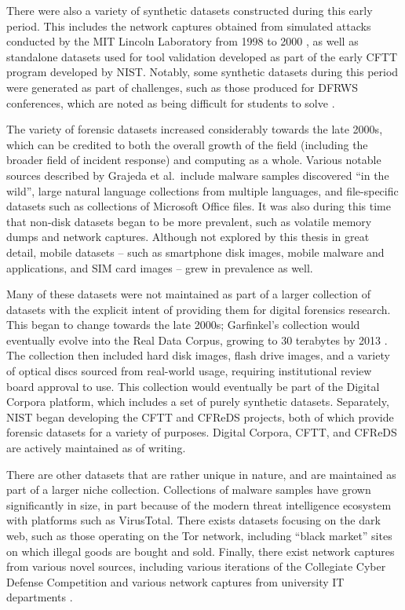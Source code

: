 \documentclass[letterpaper,12pt]{report}
\begin{document}
There were also a variety of synthetic datasets constructed during this
early period. This includes the network captures obtained from simulated
attacks conducted by the MIT Lincoln Laboratory from 1998 to 2000
\cite{garfinkelForensicCorporaChallenge2007}, as well as standalone
datasets used for tool validation developed as part of the early CFTT
program developed by NIST. Notably, some synthetic datasets during this
period were generated as part of challenges, such as those produced for
DFRWS conferences, which are noted as being difficult for students to
solve \cite{woodsCreatingRealisticCorpora2011}.

The variety of forensic datasets increased considerably towards the late
2000s, which can be credited to both the overall growth of the field
(including the broader field of incident response) and computing as a
whole. Various notable sources described by Grajeda et al.~include
malware samples discovered ``in the wild'', large natural language
collections from multiple languages, and file-specific datasets such as
collections of Microsoft Office files. It was also during this time that
non-disk datasets began to be more prevalent, such as volatile memory
dumps and network captures. Although not explored by this thesis in
great detail, mobile datasets -- such as smartphone disk images, mobile
malware and applications, and SIM card images -- grew in prevalence as
well.

Many of these datasets were not maintained as part of a larger
collection of datasets with the explicit intent of providing them for
digital forensics research. This began to change towards the late 2000s;
Garfinkel's collection would eventually evolve into the Real Data
Corpus, growing to 30 terabytes by 2013
\cite{garfinkelBringingScienceDigital2009a,yannikosDataCorporaDigital2014}.
The collection then included hard disk images, flash drive images, and a
variety of optical discs sourced from real-world usage, requiring
institutional review board approval to use. This collection would
eventually be part of the Digital Corpora platform, which includes a set
of purely synthetic datasets. Separately, NIST began developing the CFTT
and CFReDS projects, both of which provide forensic datasets for a
variety of purposes. Digital Corpora, CFTT, and CFReDS are actively
maintained as of writing.

There are other datasets that are rather unique in nature, and are
maintained as part of a larger niche collection. Collections of malware
samples have grown significantly in size, in part because of the modern
threat intelligence ecosystem with platforms such as VirusTotal. There
exists datasets focusing on the dark web, such as those operating on the
Tor network, including ``black market'' sites on which illegal goods are
bought and sold. Finally, there exist network captures from various
novel sources, including various iterations of the Collegiate Cyber
Defense Competition and various network captures from university IT
departments \cite{grajedaAvailabilityDatasetsDigital2017}.
\end{document}
